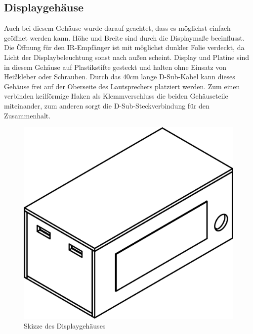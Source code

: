 \documentclass[11pt, titlepage]{report}
\begin{document}
			\subsection{Displaygehäuse}
				Auch bei diesem Gehäuse wurde darauf geachtet, dass es möglichst einfach geöffnet werden kann. Höhe und Breite sind durch die Displaymaße beeinflusst. Die Öffnung für den IR-Empfänger ist mit möglichst dunkler Folie verdeckt, da Licht der Displaybeleuchtung sonst nach außen scheint. Display und Platine sind in diesem Gehäuse auf Plastikstifte gesteckt und halten ohne Einsatz von Heißkleber oder Schrauben. Durch das 40cm lange D-Sub-Kabel kann dieses Gehäuse frei auf der Oberseite des Lautsprechers platziert werden. Zum einen verbinden keilförmige Haken als Klemmverschluss die beiden Gehäuseteile miteinander, zum anderen sorgt die D-Sub-Steckverbindung für den Zusammenhalt.
				\vspace{3em}
				\begin{figure}[htbp]
					\centering
					\includegraphics[width=0.75\linewidth]{./img/Display_Case_Draw.png}
					\caption{Skizze des Displaygehäuses
					\label{fig:imgDisplayDraw}}			
				\end{figure}
			\newpage
\end{document}
